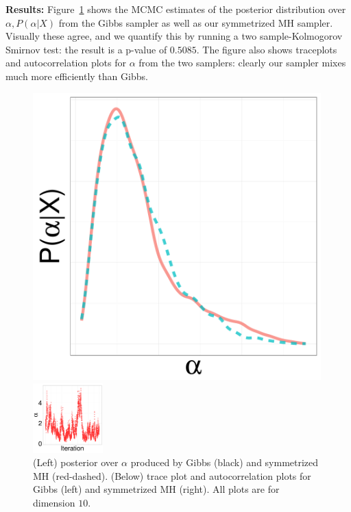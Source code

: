 \noindent \textbf{Results:}
Figure~\ref{fig:TRACE_EXP} shows the MCMC estimates of the posterior distribution over $\alpha, P(\alpha|X)$ from the Gibbs sampler as well as our symmetrized MH sampler. Visually these agree, and we quantify this by running a two sample-Kolmogorov Smirnov test: the result is a p-value of $0.5085$. The figure also shows traceplots and autocorrelation plots for $\alpha$ from the two samplers:
 clearly our sampler mixes much more efficiently than Gibbs.
  \begin{figure}[H]
  \begin{minipage}[!hp]{0.25\linewidth}
    \includegraphics [width=0.99\textwidth, angle=0]{figs/EXP_ks/exp_hist_44_05_10_.pdf}
  \end{minipage}
  \begin{minipage}[!hp]{0.74\linewidth}
    \caption{(Left) posterior over $\alpha$ produced by Gibbs (black) and symmetrized MH (red-dashed). (Below) trace plot and autocorrelation plots for Gibbs (left) and symmetrized MH (right). All plots are for dimension $10$. \ \ }
     \label{fig:TRACE_EXP}
  \end{minipage}
  \centering
  \begin{minipage}[!hp]{0.97\linewidth}
    \includegraphics [width=0.24\textwidth, angle=0]{figs/EXP_ks/exp_traceGBS_44_05_10_.pdf}

\end{minipage}
\end{figure}
